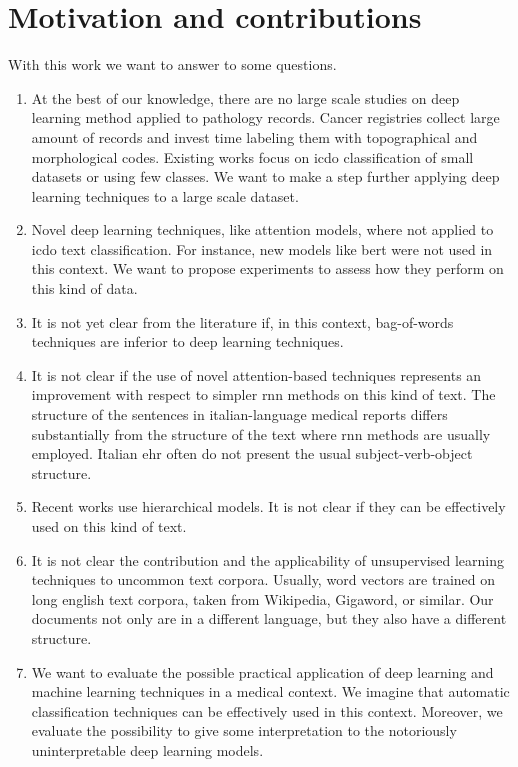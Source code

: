 \section{Motivation and contributions}
With this work we want to answer to some questions.
\begin{enumerate}
\item At the best of our
  knowledge, there are no large scale studies on deep learning method
  applied to pathology records. Cancer registries collect large amount of
  records and invest time labeling them with topographical and
  morphological codes. Existing works focus on \ac{icdo} classification
  of small datasets or using few 
  classes. We want to make a step further applying deep learning
  techniques to a large scale dataset.
\item Novel deep learning techniques, like attention models, where not
  applied 
  to \ac{icdo} text classification. For instance, new models like
  \ac{bert} were not used in this context. We want to propose
  experiments to assess how they perform on this kind of data.
\item It is not yet clear from the literature if, in this context,
  bag-of-words techniques are inferior to deep learning techniques.
\item It is not clear if the use of novel attention-based techniques
  represents an improvement with respect to simpler \ac{rnn} methods on this
  kind of text. The structure of the sentences in italian-language
  medical reports differs substantially from the structure of the text
  where \ac{rnn} methods are usually employed. Italian \ac{ehr} often
  do not present the usual subject-verb-object structure.
\item Recent works use hierarchical models. It is not clear if they can
  be effectively used on this kind of text.
\item It is not clear the contribution and the applicability of
  unsupervised learning techniques to uncommon text corpora. Usually,
  word vectors are trained on long english text corpora, taken from
  Wikipedia, Gigaword, or similar. Our documents not only are in a
  different language, but they also have a different structure.
\item We want to evaluate the possible practical application of deep
  learning and machine learning techniques in a medical context. We
  imagine that automatic classification techniques can be effectively
  used in this context. Moreover, we evaluate the possibility to give
  some interpretation to the notoriously uninterpretable deep learning
  models. 
\end{enumerate}

